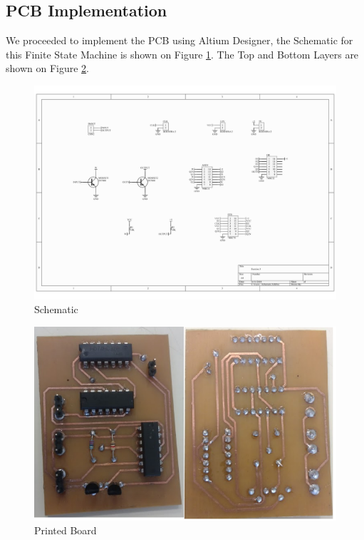 \subsection{\color{purple}PCB Implementation}

We proceeded to implement the PCB using Altium Designer, the Schematic
for this Finite State Machine is shown on Figure \ref{3_2}. The Top
and Bottom Layers are shown on Figure \ref{3_3}.

\begin{figure}[H]
\begin{centering}
\includegraphics[scale=0.5]{../Exercise3/Assignment/images/Schematic}
\par\end{centering}
\caption{Schematic}
\label{3_2}

\end{figure}

\begin{figure}[H]
\begin{centering}
\includegraphics[scale=0.3]{../Exercise3/Assignment/images/TB}
\par\end{centering}
\caption{Printed Board}
\label{3_3}

\end{figure}

